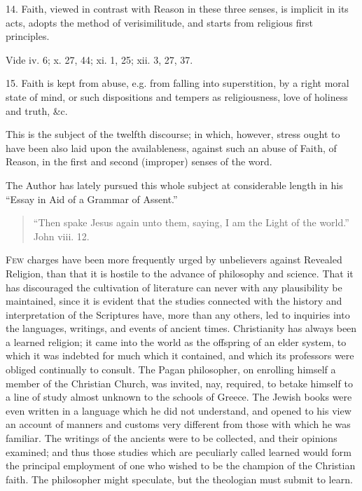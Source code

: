 14. Faith, viewed in contrast with Reason in these three senses, is
implicit in its acts, adopts the method of verisimilitude, and starts
from religious first principles.



Vide iv. 6; x. 27, 44; xi. 1, 25; xii. 3, 27, 37.


15. Faith is kept from abuse, e.g. from falling into superstition, by
a right moral state of mind, or such dispositions and tempers as
religiousness, love of holiness and truth, \&c.


This is the subject of the twelfth discourse; in
which, however, stress ought to have been also laid upon the
availableness, against such an abuse of Faith, of Reason, in the first
and second (improper) senses of the word.


The Author has lately pursued this whole subject at considerable
length in his ``Essay in Aid of a Grammar of
Assent.''


\begin{quote}

``Then spake Jesus again unto them, saying, I am the Light of
the world.'' John viii. 12.

\end{quote}

F\textsc{ew} charges have been more frequently urged by unbelievers against
Revealed Religion, than that it is hostile to the advance of
philosophy and science. That it has discouraged the cultivation of
literature can never with any plausibility be maintained, since it is
evident that the studies connected with the history and interpretation
of the Scriptures have, more than any others, led to inquiries into
the languages, writings, and events of ancient times. Christianity has
always been a learned religion; it came into the world as the
offspring of an elder system, to which it was indebted for much which
it contained, and which its professors were obliged continually to
consult. The Pagan philosopher, on enrolling himself a member of the
Christian Church, was invited, nay, required, to betake himself to a
line of study almost unknown to the schools of Greece. The Jewish books were even written in a language which he did not understand, and
opened to his view an account of manners and customs very different
from those with which he was familiar. The writings of the ancients
were to be collected, and their opinions examined; and thus those
studies which are peculiarly called learned would form the principal
employment of one who wished to be the champion of the Christian
faith. The philosopher might speculate, but the theologian must submit
to learn.

